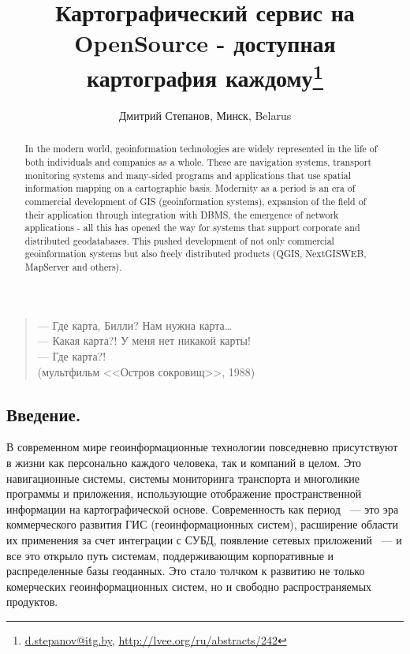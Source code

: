 \documentclass[10pt, a5paper]{article}
\begin{document}
\title{Картографический сервис на OpenSource - доступная картография каждому\footnote{\url{d.stepanov@itg.by}, \url{http://lvee.org/ru/abstracts/242}}}
\author{Дмитрий Степанов, Минск, Belarus}
\maketitle
\begin{abstract}
In the modern world, geoinformation technologies are widely represented in the life of both individuals and companies as a whole. These are navigation systems, transport monitoring systems and many-sided programs and applications that use spatial information mapping on a cartographic basis. Modernity as a period is an era of commercial development of GIS \linebreak(geoinformation systems), expansion of the field of their application through integration with DBMS, the emergence of network applications - all this has opened the way for systems that support corporate and distributed geodatabases. This pushed development of not only commercial geoinformation systems but also freely \linebreak distributed products (QGIS, NextGISWEB, MapServer and others).
\end{abstract}
\begin{flushleft}
\begin{verse}
— Где карта, Билли? Нам нужна карта\ldots{} \\
— Какая карта?! У меня нет никакой карты!\\
— Где карта?!\\
(мультфильм <<Остров сокровищ>>, 1988)
\end{verse}
\end{flushleft}
\subsection*{Введение.}

В современном мире геоинформационные технологии повседневно присутствуют в жизни как персонально каждого человека, так и компаний в целом. Это навигационные системы, системы мониторинга транспорта и многоликие программы и приложения, использующие отображение пространственной информации на картографической основе. 
Современность как период ~--- это эра коммерческого развития ГИС (геоинформационных систем), расширение области их применения за счет интеграции с СУБД, появление сетевых приложений ~--- и все это открыло путь системам, поддерживающим корпоративные и распределенные базы геоданных.  Это стало толчком к развитию не только комерческих геоинформационных систем, но и свободно распространяемых продуктов.
\end{document}
